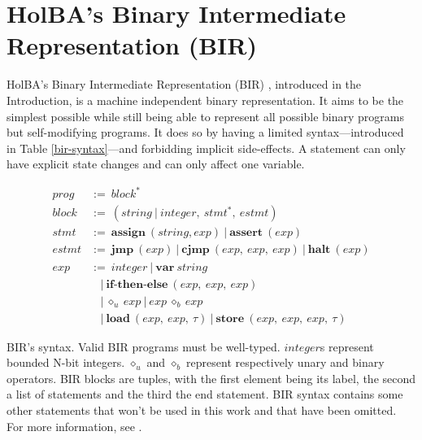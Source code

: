 \documentclass{kththesis}
\begin{document}
{\section{HolBA's Binary Intermediate Representation (BIR)} \label{bir-presentation}

HolBA's Binary Intermediate Representation (BIR) \cite{lindner_trabin:_2019}, introduced in the Introduction, is a machine independent binary representation. It aims to be the simplest possible while still being able to represent all possible binary programs but self-modifying programs. It does so by having a limited syntax---introduced in Table \ref{bir-syntax}---and forbidding implicit side-effects. A statement can only have explicit state changes and can only affect one variable.

\begin{table}[h!]
	\begin{align*}
		prog   & :=~block^{\ast}                                                             \\
		block  & :=~(string~|~integer,~stmt^{\ast},~estmt)                                   \\
		stmt   & :=~\textbf{assign}~(string, exp)~|~\textbf{assert}~(exp)                    \\
        estmt  & :=~\textbf{jmp}~(exp)~|~\textbf{cjmp}~(exp,~exp,~exp)~|~\mathbf{halt}~(exp) \\
		exp    & :=~integer~|~\textbf{var}~string                                            \\
		       & ~~~~|~\textbf{if-then-else}~(exp,~exp,~exp)                                 \\
		       & ~~~~|~\diamond_{u}~exp~|~exp~\diamond_{b}~exp~                              \\
		       & ~~~~|~\textbf{load}~(exp,~exp,~\tau)~|~\textbf{store}~(exp,~exp,~exp,~\tau) 
	\end{align*}
	\caption{BIR's syntax. Valid BIR programs must be well-typed. $integer$s represent bounded N-bit integers. $\diamond_{u}$ and $\diamond_{b}$ represent respectively unary and binary operators. BIR blocks are tuples, with the first element being its label, the second a list of statements and the third the end statement. BIR syntax contains some other statements that won't be used in this work and that have been omitted. For more information, see \cite{lindner_trabin:_2019}.}
	\label{bir-syntax}
\end{table}

}
\end{document}
